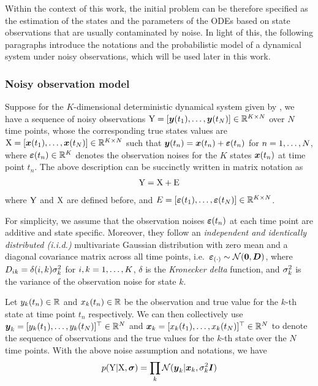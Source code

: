 Within the context of this work, the initial problem can be therefore specified as the estimation of the states and the parameters of the ODEs based on state observations that are usually contaminated by noise.
In light of this, the following paragraphs introduce the notations and the probabilistic model of a dynamical system under noisy observations, which will be used later in this work.

\subsubsection*{Noisy observation model}

Suppose for the $K$-dimensional deterministic dynamical system given by , we have a sequence of noisy observations $\mathrm{Y} = [\boldsymbol{y}(t_{1}),\dots,\boldsymbol{y}(t_{N})] \in \mathbb{R}^{K \times N}$ over $N$ time points, whose the corresponding true states values are $\mathrm{X} = [\boldsymbol{x}(t_{1}),\dots,\boldsymbol{x}(t_{N})] \in \mathbb{R}^{K \times N}$ such that $\boldsymbol{y}(t_{n}) = \boldsymbol{x}(t_{n}) + \boldsymbol{\varepsilon}(t_{n})$ for $n=1,\dots,N$, where $\boldsymbol{\varepsilon}(t_{n}) \in \mathbb{R}^K$ denotes the observation noises for the $K$ states $\boldsymbol{x}(t_{n})$ at time point $t_n$.
The above description can be succinctly written in matrix notation as
\begin{align}
    \mathrm{Y} = \mathrm{X} + \mathrm{E}
    \nonumber
\end{align}
where $\mathrm{Y}$ and $\mathrm{X}$ are defined before, and $E = [\boldsymbol{\varepsilon}(t_{1}),\dots,\boldsymbol{\varepsilon}(t_{N})] \in \mathbb{R}^{K \times N}$.

For simplicity, we assume that the observation noises $\boldsymbol{\varepsilon}(t_{n})$ at each time point are additive and state specific. 
Moreover, they follow an \emph{independent and identically distributed (i.i.d.)} multivariate Gaussian distribution with zero mean and a diagonal covariance matrix across all time points, i.e.\ $\boldsymbol{\varepsilon}_{(\cdot)} \sim \mathcal{N}(\boldsymbol{0}, \boldsymbol{D})$, where $D_{ik} = \delta(i,k)\sigma_{k}^2$ for $i, k = 1,\dots,K$, $\delta$ is the \emph{Kronecker delta} function, and $\sigma_{k}^2$ is the variance of the observation noise for state $k$. 

Let $y_{k}(t_{n}) \in \mathbb{R}$ and $x_{k}(t_{n}) \in \mathbb{R}$ be the observation and true value for the $k$-th state at time point $t_n$ respectively. 
We can then collectively use $\boldsymbol{y}_{k} = [y_{k}(t_{1}),\dots,y_{k}(t_{N})]^\top \in \mathbb{R}^N$ and $\boldsymbol{x}_{k} = [x_{k}(t_{1}),\dots,x_{k}(t_{N})]^\top \in \mathbb{R}^N$ to denote the sequence of observations and the true values for the $k$-th state over the $N$ time points.
With the above noise assumption and notations, we have
\begin{align}
    p(\mathrm{Y}\vert\mathrm{X},\boldsymbol{\sigma}) 
    = \prod_k{
        \mathcal{N}(\boldsymbol{y}_{k}\vert\boldsymbol{x}_{k}, \sigma_{k}^2\boldsymbol{I})
        }
    \label{eq-ode-noise-model}        
\end{align}

